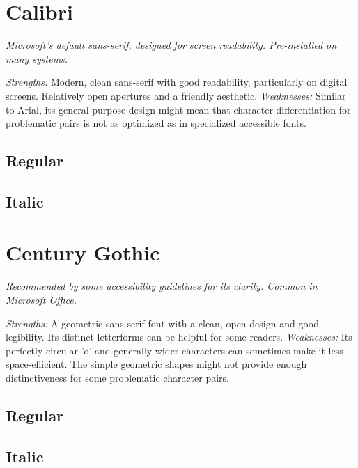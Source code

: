 \pagebreak
\section{Calibri}\label{sec:calibri}
\emph{Microsoft’s default sans-serif, designed for screen readability. Pre-installed on many systems.}
\begin{raggedright}
\emph{Strengths:} Modern, clean sans-serif with good readability, particularly on digital screens. Relatively open apertures and a friendly aesthetic.
\emph{Weaknesses:} Similar to Arial, its general-purpose design might mean that character differentiation for problematic pairs is not as optimized as in specialized accessible fonts.

\subsection{Regular}
\FontSample{\calibrifont}

\subsection{Italic}
\FontSample{{\calibrifont\itshape}}
\end{raggedright}


\pagebreak
\section{Century Gothic}\label{sec:centurygothic}
\emph{Recommended by some accessibility guidelines for its clarity. Common in Microsoft Office.}
\begin{raggedright}
\emph{Strengths:} A geometric sans-serif font with a clean, open design and good legibility. Its distinct letterforms can be helpful for some readers.
\emph{Weaknesses:} Its perfectly circular 'o' and generally wider characters can sometimes make it less space-efficient. The simple geometric shapes might not provide enough distinctiveness for some problematic character pairs.

\subsection{Regular}
\FontSample{\centurygothicfont}

\subsection{Italic}
\FontSample{{\centurygothicfont\itshape}}
\end{raggedright}
